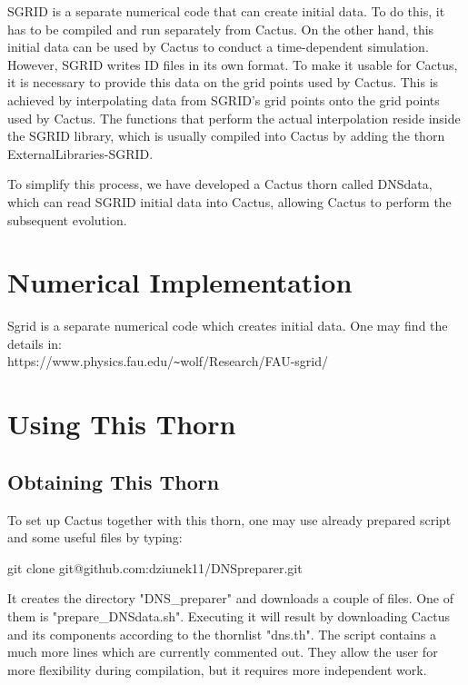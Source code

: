 SGRID is a separate numerical code that can create initial data. To do this, it has to be compiled and run separately from Cactus. On the other hand, this initial data can be used by Cactus to conduct a time-dependent simulation. However, SGRID writes ID files in its own format. To make it usable for Cactus, it is necessary to provide this data on the grid points used by Cactus. This is achieved by interpolating data from SGRID's grid points onto the grid points used by Cactus. The functions that perform the actual interpolation reside inside the SGRID library, which is usually compiled into Cactus by adding the thorn ExternalLibraries-SGRID.

To simplify this process, we have developed a Cactus thorn called DNSdata, which can read SGRID initial data into Cactus, allowing Cactus to perform the subsequent evolution.


\section{Numerical Implementation}

Sgrid is a separate numerical code which creates initial data. One may find the details
in: \\
https://www.physics.fau.edu/\verb!~!wolf/Research/FAU-sgrid/

\section{Using This Thorn}

\subsection{Obtaining This Thorn}

To set up Cactus together with this thorn, one may use already prepared script and some useful files by typing:

git clone git@github.com:dziunek11/DNSpreparer.git

It creates the directory "DNS\_preparer" and downloads a couple of files. One of them is "prepare\_DNSdata.sh". Executing it will result by downloading Cactus and its components according to the thornlist "dns.th". The script contains a much more lines which are currently commented out. They allow the user for more flexibility during compilation, but it requires more independent work.

